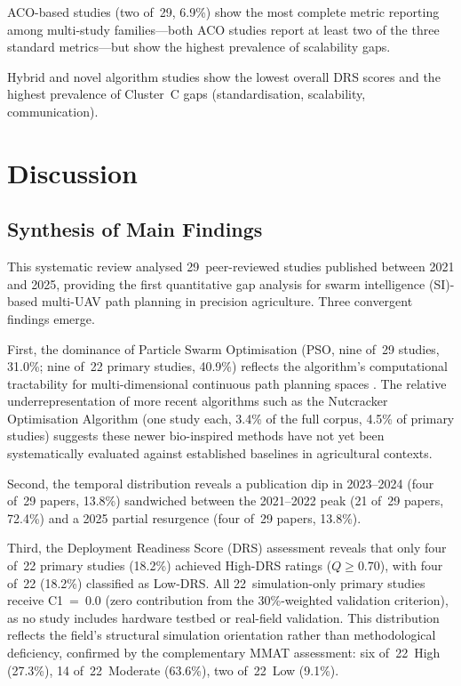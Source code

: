 \documentclass[review,3p]{elsarticle}
\begin{document}
ACO-based studies (two of~29, 6.9\%) show the most complete metric reporting
among multi-study families---both ACO studies report at least two of the
three standard metrics---but show the highest prevalence of scalability gaps.

Hybrid and novel algorithm studies show the lowest overall DRS scores and the
highest prevalence of Cluster~C gaps (standardisation, scalability,
communication).


\section{Discussion}

\subsection{Synthesis of Main Findings}
\label{subsec:synthesis}

This systematic review analysed 29~peer-reviewed studies published between
2021 and 2025, providing the first quantitative gap analysis for swarm
intelligence (SI)-based multi-UAV path planning in precision agriculture.
Three convergent findings emerge.

First, the dominance of Particle Swarm Optimisation (PSO, nine of~29 studies,
31.0\%; nine of~22 primary studies, 40.9\%) reflects the algorithm's
computational tractability for multi-dimensional continuous path planning
spaces \cite{puente2022,sharma2022}. The relative underrepresentation of more
recent algorithms such as the Nutcracker Optimisation Algorithm \cite{xiao2025}
(one study each, 3.4\% of the full corpus, 4.5\% of primary studies) suggests
these newer bio-inspired methods have not yet been systematically evaluated
against established baselines in agricultural contexts.

Second, the temporal distribution reveals a publication dip in 2023--2024
(four of~29 papers, 13.8\%) sandwiched between the 2021--2022 peak
(21 of~29 papers, 72.4\%) and a 2025 partial resurgence (four of~29 papers,
13.8\%).

Third, the Deployment Readiness Score (DRS) assessment reveals that only
four of~22 primary studies (18.2\%) achieved High-DRS ratings ($Q \geq 0.70$),
with four of~22 (18.2\%) classified as Low-DRS. All 22~simulation-only primary
studies receive C1~=~0.0 (zero contribution from the 30\%-weighted validation
criterion), as no study includes hardware testbed or real-field validation.
This distribution reflects the field's structural simulation orientation
rather than methodological deficiency, confirmed by the complementary MMAT
assessment: six of~22~High (27.3\%), 14 of~22~Moderate (63.6\%),
two of~22~Low (9.1\%).
\end{document}
